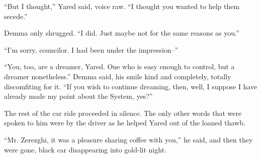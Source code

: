 ``But I thought,'' Yared said, voice raw. ``I thought you wanted to help them secede.''

Demma only shrugged. ``I did. Just maybe not for the same reasons as you.''

``I'm sorry, councilor. I had been under the impression--''

``You, too, are a dreamer, Yared. One who is easy enough to control, but a dreamer nonetheless.'' Demma said, his smile kind and completely, totally discomfiting for it. ``If you wish to continue dreaming, then, well, I suppose I have already made my point about the System, yes?''

The rest of the car ride proceeded in silence. The only other words that were spoken to him were by the driver as he helped Yared out of the loaned thawb.

``Mr. Zerezghi, it was a pleasure sharing coffee with you,'' he said, and then they were gone, black car disappearing into gold-lit night.
